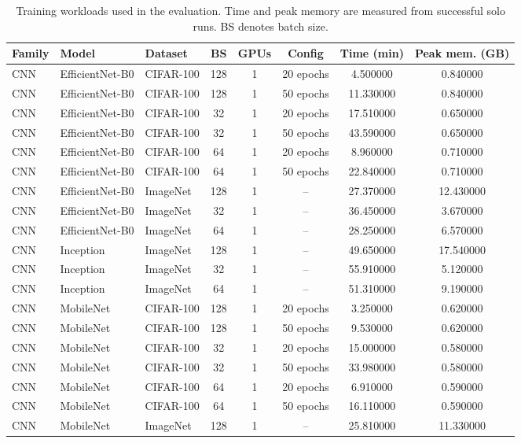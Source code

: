 \begin{table}
\caption{Training workloads used in the evaluation. Time and peak memory are measured from successful solo runs. BS denotes batch size.}
\label{tab:appendix-workloads}
\begin{tabular}{lllccccc}
\toprule
Family & Model & Dataset & BS & GPUs & Config & Time (min) & Peak mem. (GB) \\
\midrule
CNN & EfficientNet-B0 & CIFAR-100 & 128 & 1 & 20 epochs & 4.500000 & 0.840000 \\
CNN & EfficientNet-B0 & CIFAR-100 & 128 & 1 & 50 epochs & 11.330000 & 0.840000 \\
CNN & EfficientNet-B0 & CIFAR-100 & 32 & 1 & 20 epochs & 17.510000 & 0.650000 \\
CNN & EfficientNet-B0 & CIFAR-100 & 32 & 1 & 50 epochs & 43.590000 & 0.650000 \\
CNN & EfficientNet-B0 & CIFAR-100 & 64 & 1 & 20 epochs & 8.960000 & 0.710000 \\
CNN & EfficientNet-B0 & CIFAR-100 & 64 & 1 & 50 epochs & 22.840000 & 0.710000 \\
CNN & EfficientNet-B0 & ImageNet & 128 & 1 & -- & 27.370000 & 12.430000 \\
CNN & EfficientNet-B0 & ImageNet & 32 & 1 & -- & 36.450000 & 3.670000 \\
CNN & EfficientNet-B0 & ImageNet & 64 & 1 & -- & 28.250000 & 6.570000 \\
CNN & Inception & ImageNet & 128 & 1 & -- & 49.650000 & 17.540000 \\
CNN & Inception & ImageNet & 32 & 1 & -- & 55.910000 & 5.120000 \\
CNN & Inception & ImageNet & 64 & 1 & -- & 51.310000 & 9.190000 \\
CNN & MobileNet & CIFAR-100 & 128 & 1 & 20 epochs & 3.250000 & 0.620000 \\
CNN & MobileNet & CIFAR-100 & 128 & 1 & 50 epochs & 9.530000 & 0.620000 \\
CNN & MobileNet & CIFAR-100 & 32 & 1 & 20 epochs & 15.000000 & 0.580000 \\
CNN & MobileNet & CIFAR-100 & 32 & 1 & 50 epochs & 33.980000 & 0.580000 \\
CNN & MobileNet & CIFAR-100 & 64 & 1 & 20 epochs & 6.910000 & 0.590000 \\
CNN & MobileNet & CIFAR-100 & 64 & 1 & 50 epochs & 16.110000 & 0.590000 \\
CNN & MobileNet & ImageNet & 128 & 1 & -- & 25.810000 & 11.330000 \\

\end{tabular}
\end{table}
